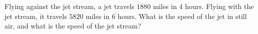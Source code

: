 Flying against the jet stream, a jet travels $1880$ miles in $4$ hours. Flying with the jet stream, it travels $5820$ miles in $6$ hours. What is the speed of the jet in still air, and what is the speed of the jet stream?
